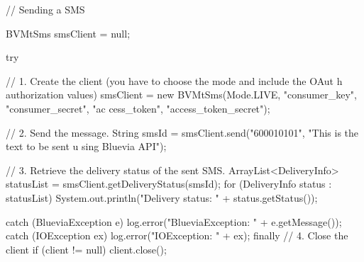 \begin{DoxyCode}
// Sending a SMS

BVMtSms smsClient = null;

try {

        // 1. Create the client (you have to choose the mode and include the OAut
      h authorization values)
        smsClient = new BVMtSms(Mode.LIVE, "consumer_key", "consumer_secret", "ac
      cess_token", "access_token_secret");

        // 2. Send the message.
        String smsId = smsClient.send("600010101", "This is the text to be sent u
      sing Bluevia API");

        // 3. Retrieve the delivery status of the sent SMS.
        ArrayList<DeliveryInfo> statusList = smsClient.getDeliveryStatus(smsId);
    for (DeliveryInfo status : statusList) {
        System.out.println("Delivery status: " + status.getStatus());
    }

} catch (BlueviaException e) {
        log.error("BlueviaException: " + e.getMessage());
} catch (IOException ex) {
        log.error("IOException: " + ex);
} finally {
        // 4. Close the client
        if (client != null)     client.close();                 
}
\end{DoxyCode}
 